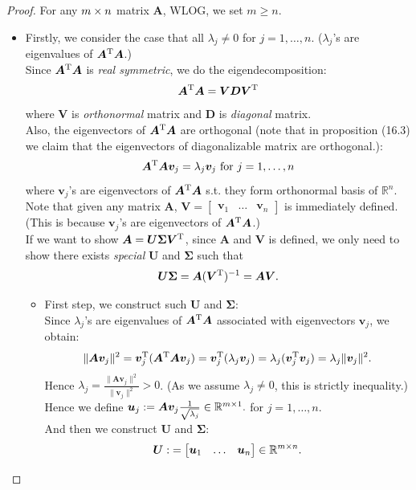 \begin{proof}
For any $m\times n$ matrix $\bm A$, WLOG, we set $m\ge n$.
\begin{itemize}
\item
Firstly, we consider the case that all $\lambda_j\ne0$ for $j=1,\dots,n$. ($\lambda_j$'s are eigenvalues of $\bm A^{\mathrm T}\bm A$.)\\
Since $\bm A^{\mathrm T}\bm A$ is \textit{real symmetric}, we do the eigendecomposition:
\[
\bm A^{\mathrm T}\bm A=\bm V\bm D\bm V^{\mathrm T}
\]
where $\bm V$ is \textit{orthonormal} matrix and $\bm D$ is \textit{diagonal} matrix.\\
Also, the eigenvectors of $\bm A^{\mathrm T}\bm A$ are orthogonal (note that in proposition (16.3) we claim that the eigenvectors of diagonalizable matrix are orthogonal.):
\enlargethispage{1cm}
\[
\bm A^{\mathrm T}\bm A\bm v_j=\lambda_j\bm v_j\text{ for }j=1,\dots,n
\]
where $\bm v_j$'s are eigenvectors of $\bm A^{\mathrm T}\bm A$ s.t. they form orthonormal basis of $\mathbb{R}^n$.\\
\newpage
Note that given any matrix $\bm A$, $\bm V=\begin{bmatrix}
\bm v_1&\dots&\bm v_n
\end{bmatrix}$ is immediately defined. (This is because $\bm v_j$'s are eigenvectors of $\bm A^{\mathrm T}\bm A$.)\\
If we want to show $\bm A=\bm U\bm\Sigma\bm V^{\mathrm T}$, since $\bm A$ and $\bm V$ is defined, we only need to show there exists \textit{special} $\bm U$ and $\bm\Sigma$ such that
\[
\bm U\bm\Sigma=\bm A(\bm V^{\mathrm T})^{-1}=\bm A\bm V.
\]
\begin{itemize}
\item
First step, we construct such $\bm U$ and $\bm\Sigma$:\\
Since $\lambda_j$'s are eigenvalues of $\bm A^{\mathrm T}\bm A$ associated with eigenvectors $\bm v_j$, we obtain:
\[
\|\bm A\bm v_j\|^2=\bm v_j^{\mathrm T}(\bm A^{\mathrm T}\bm A\bm v_j)=\bm v_j^{\mathrm T}(\lambda_j\bm v_j)=\lambda_j(\bm v_j^{\mathrm T}\bm v_j)=\lambda_j\|\bm v_j\|^2.
\]
Hence $\lambda_j=\frac{\|\bm A\bm v_j\|^2}{\|\bm v_j\|^2}>0$. (As we assume $\lambda_j\ne0$, this is strictly inequality.)\\
Hence we define $\bm u_j:=\bm A\bm v_j\frac{1}{\sqrt{\lambda_j}}\in\mathbb{R}^{m\times 1}.$ for $j=1,\dots,n$.\\
And then we construct $\bm U$ and $\bm\Sigma$:
\begin{align*}
\bm U:&=\begin{bmatrix}
\bm u_1&\dots&\bm u_n
\end{bmatrix}\in\mathbb{R}^{m\x n}.\\

\end{align*}
\end{itemize}
\end{itemize}
\end{proof}
